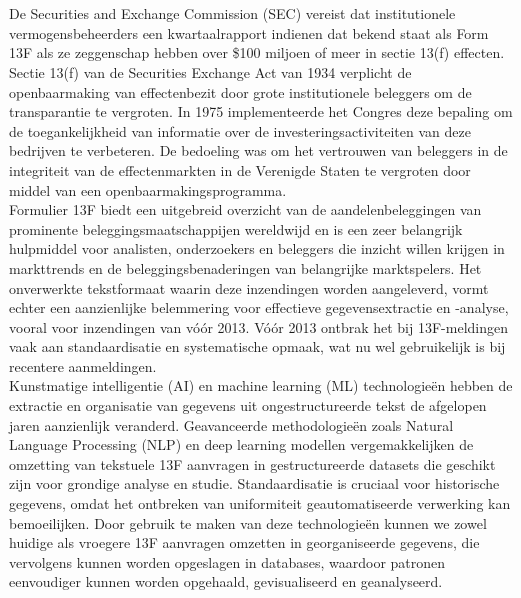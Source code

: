 \chapter{}%
\label{ch:stand-van-zaken}



De Securities and Exchange Commission (SEC) vereist dat institutionele vermogensbeheerders een kwartaalrapport indienen dat bekend staat als Form 13F als ze zeggenschap hebben over \$100 miljoen of meer in sectie 13(f) effecten. Sectie 13(f) van de Securities Exchange Act van 1934 verplicht de openbaarmaking van effectenbezit door grote institutionele beleggers om de transparantie te vergroten. In 1975 implementeerde het Congres deze bepaling om de toegankelijkheid van informatie over de investeringsactiviteiten van deze bedrijven te verbeteren. De bedoeling was om het vertrouwen van beleggers in de integriteit van de effectenmarkten in de Verenigde Staten te vergroten door middel van een openbaarmakingsprogramma\autocite{SECform13F2024}.\\
Formulier 13F biedt een uitgebreid overzicht van de aandelenbeleggingen van prominente beleggingsmaatschappijen wereldwijd en is een zeer belangrijk hulpmiddel voor analisten, onderzoekers en beleggers die inzicht willen krijgen in markttrends en de beleggingsbenaderingen van belangrijke marktspelers. Het onverwerkte tekstformaat waarin deze inzendingen worden aangeleverd, vormt echter een aanzienlijke belemmering voor effectieve gegevensextractie en -analyse, vooral voor inzendingen van vóór 2013. Vóór 2013 ontbrak het bij 13F-meldingen vaak aan standaardisatie en systematische opmaak, wat nu wel gebruikelijk is bij recentere aanmeldingen.\\
Kunstmatige intelligentie (AI) en machine learning (ML) technologieën hebben de extractie en organisatie van gegevens uit ongestructureerde tekst de afgelopen jaren aanzienlijk veranderd. Geavanceerde methodologieën zoals Natural Language Processing (NLP) en deep learning modellen vergemakkelijken de omzetting van tekstuele 13F aanvragen in gestructureerde datasets die geschikt zijn voor grondige analyse en studie. Standaardisatie is cruciaal voor historische gegevens, omdat het ontbreken van uniformiteit geautomatiseerde verwerking kan bemoeilijken. Door gebruik te maken van deze technologieën kunnen we zowel huidige als vroegere 13F aanvragen omzetten in georganiseerde gegevens, die vervolgens kunnen worden opgeslagen in databases, waardoor patronen eenvoudiger kunnen worden opgehaald, gevisualiseerd en geanalyseerd.\\
